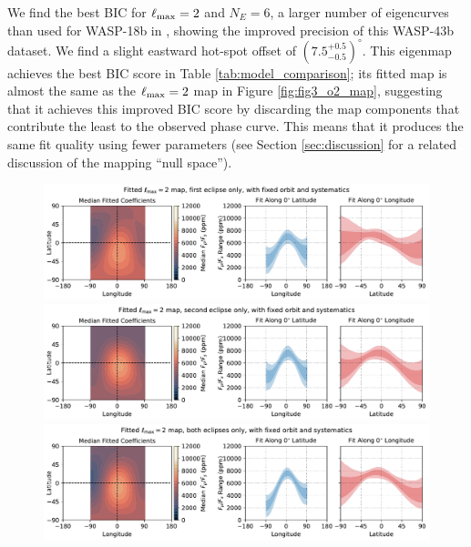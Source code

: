 \documentclass[twocolumn]{aastex631}
\begin{document}
We find the best BIC for $\ell_{\rm max} = 2$ and $N_E = 6$, a larger number of eigencurves than used for WASP-18b in \citet{coulombe2023wasp18b}, showing the improved precision of this WASP-43b dataset. We find a slight eastward hot-spot offset of $(7.5^{+0.5}_{-0.5})^{\circ}$. This eigenmap achieves the best BIC score in Table \ref{tab:model_comparison}; its fitted map is almost the same as the $\ell_{\rm max}=2$ map in Figure \ref{fig:fig3_o2_map}, suggesting that it achieves this improved BIC score by discarding the map components that contribute the least to the observed phase curve. This means that it produces the same fit quality using fewer parameters (see Section \ref{sec:discussion} for a related discussion of the mapping ``null space'').

\begin{figure}
    \centering
    \includegraphics[width=\textwidth]{fig6a_map_e1.pdf}
    \includegraphics[width=\textwidth]{fig6b_map_e2.pdf}
    \includegraphics[width=\textwidth]{fig6c_map_ee.pdf}

\end{figure}
\end{document}
